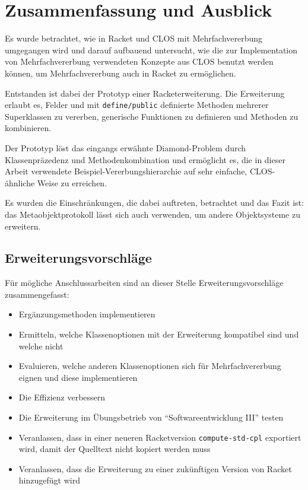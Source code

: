 \chapter{Zusammenfassung und Ausblick}
\vspace{-0.5cm}
Es wurde betrachtet, wie in Racket und CLOS mit Mehrfachvererbung umgegangen wird und darauf aufbauend untersucht, wie die zur Implementation von Mehrfachvererbung verwendeten Konzepte aus CLOS benutzt werden können, um Mehrfachvererbung auch in Racket zu ermöglichen.

Entstanden ist dabei der Prototyp einer Racketerweiterung. Die Erweiterung erlaubt es, Felder und mit \texttt{define/public} definierte Methoden mehrerer Superklassen zu vererben, generische Funktionen zu definieren und Methoden zu kombinieren.

Der Prototyp löst das eingangs erwähnte Diamond-Problem durch Klassenpräzedenz und Methodenkombination und ermöglicht es, die in dieser Arbeit verwendete Beispiel-Vererbungshierarchie auf sehr einfache, CLOS-ähnliche Weise zu erreichen.

Es wurden die Einschränkungen, die dabei auftreten, betrachtet und das Fazit ist: das Metaobjektprotokoll lässt sich auch verwenden, um andere Objektsysteme zu erweitern.
\vspace{-1cm}

\section{Erweiterungsvorschläge}
\vspace{-0.5cm}
Für mögliche Anschlussarbeiten sind an dieser Stelle Erweiterungsvorschläge zusammengefasst:
\begin{itemize}
 \item Ergänzungsmethoden implementieren
 \item Ermitteln, welche Klassenoptionen mit der Erweiterung kompatibel sind und welche nicht
 \item Evaluieren, welche anderen Klassenoptionen sich für Mehrfachvererbung eignen und diese implementieren
 \item Die Effizienz verbessern
 \item Die Erweiterung im Übungsbetrieb von ``Softwareentwicklung III'' testen
 \item Veranlassen, dass in einer neueren Racketversion \texttt{compute-std-cpl} exportiert wird, damit der Quelltext nicht kopiert werden muss
 \item Veranlassen, dass die Erweiterung zu einer zukünftigen Version von Racket hinzugefügt wird 
\end{itemize}
